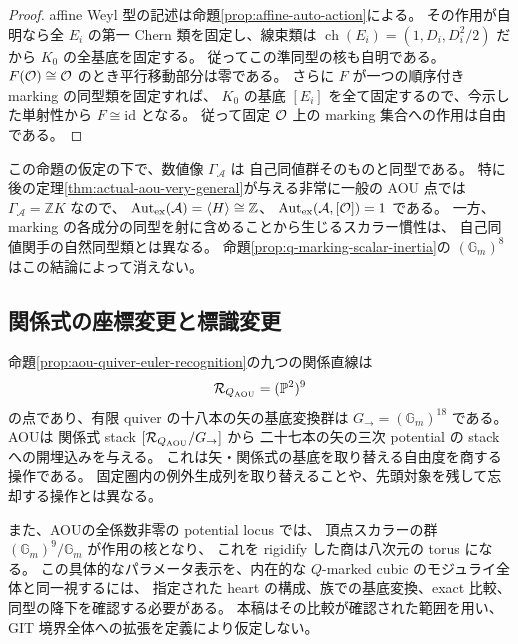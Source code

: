 \begin{proof}
affine Weyl 型の記述は命題\ref{prop:affine-auto-action}による。
その作用が自明なら全 $E_i$ の第一 Chern 類を固定し、線束類は
$\operatorname{ch}(E_i)=(1,D_i,D_i^2/2)$ だから $K_0$ の全基底を固定する。
従ってこの準同型の核も自明である。
$F(\mathcal O)\cong\mathcal O$ のとき平行移動部分は零である。
さらに $F$ が一つの順序付き marking の同型類を固定すれば、
$K_0$ の基底 $[E_i]$ を全て固定するので、今示した単射性から $F\cong\mathrm{id}$ となる。
従って固定 $\mathcal O$ 上の marking 集合への作用は自由である。
\end{proof}

この命題の仮定の下で、数値像 $\Gamma_{\mathcal A}$ は
自己同値群そのものと同型である。
特に後の定理\ref{thm:actual-aou-very-general}が与える非常に一般の AOU 点では
$\Gamma_{\mathcal A}=\mathbb ZK$ なので、
$\operatorname{Aut}_{\rm ex}(\mathcal A)=\langle H\rangle\cong\mathbb Z$、
$\operatorname{Aut}_{\rm ex}(\mathcal A,[\mathcal O])=1$ である。
一方、marking の各成分の同型を射に含めることから生じるスカラー慣性は、
自己同値関手の自然同型類とは異なる。
命題\ref{prop:q-marking-scalar-inertia}の $(\mathbb G_m)^8$ はこの結論によって消えない。

\subsection{関係式の座標変更と標識変更}
命題\ref{prop:aou-quiver-euler-recognition}の九つの関係直線は
\[
 \mathcal R_{Q_{\rm AOU}}=(\mathbb P^2)^9
\]
の点であり、有限 quiver の十八本の矢の基底変換群は
$G_{\to}=(\mathbb G_m)^{18}$ である。
AOU\cite[(5.3), (5.11), Proposition 5.1]{AOU}は
関係式 stack $[\mathcal R_{Q_{\rm AOU}}/G_{\to}]$ から
二十七本の矢の三次 potential の stack への開埋込みを与える。
これは矢・関係式の基底を取り替える自由度を商する操作である。
固定圏内の例外生成列を取り替えることや、先頭対象を残して忘却する操作とは異なる。

また、AOU\cite[Lemma 5.2, (5.17)]{AOU}の全係数非零の potential locus では、
頂点スカラーの群 $ (\mathbb G_m)^9/\mathbb G_m $ が作用の核となり、
これを rigidify した商は八次元の torus になる。
この具体的なパラメータ表示を、内在的な $Q$-marked cubic のモジュライ全体と同一視するには、
指定された heart の構成、族での基底変換、exact 比較、同型の降下を確認する必要がある。
本稿はその比較が確認された範囲を用い、GIT 境界全体への拡張を定義により仮定しない。
